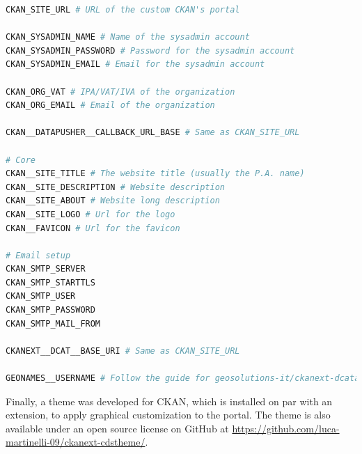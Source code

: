 \begin{lstlisting}[language=bash,caption={Configuration template file for the CKAN Open Data portal.},label=code:ckan-portal-env]
CKAN_SITE_URL # URL of the custom CKAN's portal

CKAN_SYSADMIN_NAME # Name of the sysadmin account
CKAN_SYSADMIN_PASSWORD # Password for the sysadmin account
CKAN_SYSADMIN_EMAIL # Email for the sysadmin account

CKAN_ORG_VAT # IPA/VAT/IVA of the organization
CKAN_ORG_EMAIL # Email of the organization

CKAN__DATAPUSHER__CALLBACK_URL_BASE # Same as CKAN_SITE_URL

# Core
CKAN__SITE_TITLE # The website title (usually the P.A. name)
CKAN__SITE_DESCRIPTION # Website description
CKAN__SITE_ABOUT # Website long description
CKAN__SITE_LOGO # Url for the logo
CKAN__FAVICON # Url for the favicon

# Email setup
CKAN_SMTP_SERVER
CKAN_SMTP_STARTTLS
CKAN_SMTP_USER
CKAN_SMTP_PASSWORD
CKAN_SMTP_MAIL_FROM

CKANEXT__DCAT__BASE_URI # Same as CKAN_SITE_URL

GEONAMES__USERNAME # Follow the guide for geosolutions-it/ckanext-dcatapit extension
\end{lstlisting}

Finally, a theme was developed for CKAN, which is installed on par with an extension, to apply graphical customization to the portal. The theme is also available under an open source license on GitHub at \url{https://github.com/luca-martinelli-09/ckanext-cdstheme/}.
